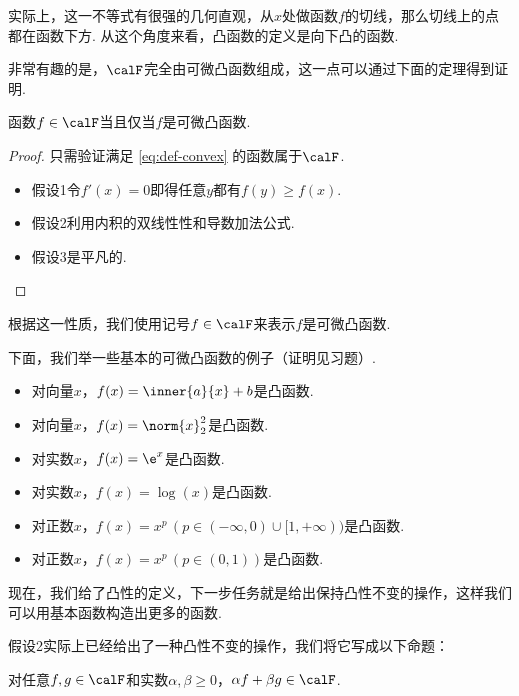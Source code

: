 实际上，这一不等式有很强的几何直观，从$x$处做函数$f$的切线，那么切线上的点都在函数下方. 从这个角度来看，凸函数的定义是向下凸的函数. 

非常有趣的是，$\calF$完全由可微凸函数组成，这一点可以通过下面的定理得到证明. 

\begin{theorem}\label{thm:differential-convex-equivalence}
    函数$f\in\calF$当且仅当$f$是可微凸函数.
\end{theorem}   
\begin{proof}
只需验证满足 \eqref{eq:def-convex} 的函数属于$\calF$.
    \begin{itemize}
        \item 假设1令$f'(x)=0$即得任意$y$都有$f(y)\geq f(x)$.
        \item 假设2利用内积的双线性性和导数加法公式.
        \item 假设3是平凡的.
    \end{itemize}
\end{proof}

根据这一性质，我们使用记号$f\in\calF$来表示$f$是可微凸函数.

下面，我们举一些基本的可微凸函数的例子（证明见习题）.

\begin{example}
    \begin{itemize}
        \item 对向量$x$，$f(x)=\inner{a}{x}+b$是凸函数.
        \item 对向量$x$，$f(x)=\norm{x}_2^2$是凸函数.
        \item 对实数$x$，$f(x)=\e^x$是凸函数.
        \item 对实数$x$，$f(x)=\log(x)$是凸函数.
        \item 对正数$x$，$f(x)=x^p\,(p\in(-\infty,0)\cup[1,+\infty))$是凸函数.
        \item 对正数$x$，$f(x)=x^p\,(p\in(0,1))$是凸函数.
    \end{itemize}
\end{example}

现在，我们给了凸性的定义，下一步任务就是给出保持凸性不变的操作，这样我们可以用基本函数构造出更多的函数. 

假设2实际上已经给出了一种凸性不变的操作，我们将它写成以下命题：
\begin{proposition}\label{prop:nonnegative-combination}
    对任意$f,g\in\calF$和实数$\alpha,\beta\geq 0$，$\alpha f+\beta g\in\calF$.
\end{proposition}

